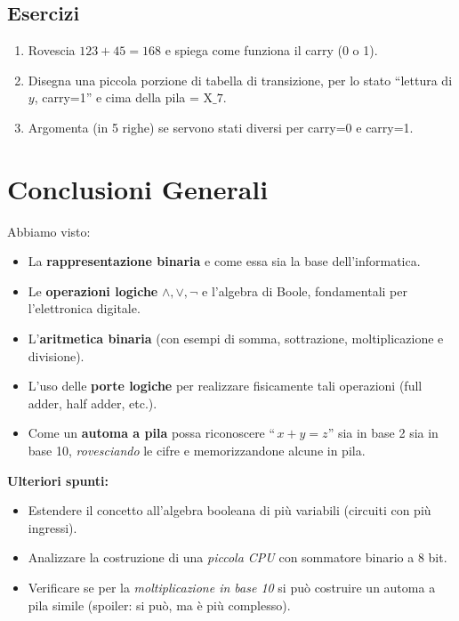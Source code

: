 \documentclass[a4paper,12pt]{report}
\begin{document}
\subsection*{Esercizi}
\begin{enumerate}
    \item Rovescia \(123 + 45 = 168\) e spiega come funziona il carry (0 o 1).
    \item Disegna una piccola porzione di tabella di transizione, per lo stato “lettura di \(y\), carry=1” e cima della pila = \(\mathrm{X\_7}\).  
    \item Argomenta (in 5 righe) se servono stati diversi per carry=0 e carry=1.
\end{enumerate}

\section*{Conclusioni Generali}
Abbiamo visto:
\begin{itemize}
    \item La \textbf{rappresentazione binaria} e come essa sia la base dell’informatica.
    \item Le \textbf{operazioni logiche} \(\land, \lor, \lnot\) e l’algebra di Boole, fondamentali per l’elettronica digitale.
    \item L’\textbf{aritmetica binaria} (con esempi di somma, sottrazione, moltiplicazione e divisione).
    \item L’uso delle \textbf{porte logiche} per realizzare fisicamente tali operazioni (full adder, half adder, etc.).
    \item Come un \textbf{automa a pila} possa riconoscere “\(\,x+y=z\)” sia in base 2 sia in base 10, \emph{rovesciando} le cifre e memorizzandone alcune in pila.
\end{itemize}

\bigskip
\noindent
\textbf{Ulteriori spunti:}
\begin{itemize}
    \item Estendere il concetto all’algebra booleana di più variabili (circuiti con più ingressi).
    \item Analizzare la costruzione di una \emph{piccola CPU} con sommatore binario a 8 bit.
    \item Verificare se per la \emph{moltiplicazione in base 10} si può costruire un automa a pila simile (spoiler: si può, ma è più complesso).
\end{itemize}


\end{document}
